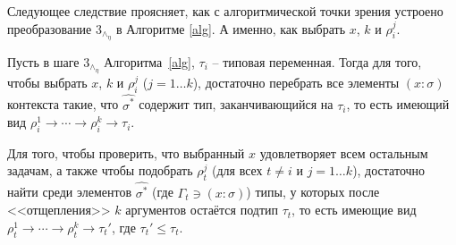 \documentclass{spbau-diploma}
\begin{document}
Следующее следствие проясняет, как с алгоритмической точки зрения устроено преобразование $3_\wedge_\eta$ в Алгоритме \ref{alg}. А именно, как выбрать $x$, $k$ и $\rho_i^j$.

\begin{corollary} \label{прояснение}
    Пусть в шаге $3_\wedge_\eta$ Алгоритма~\ref{alg}, $\tau_i$ -- типовая переменная. Тогда для того, чтобы выбрать $x$, $k$ и $\rho_i^j$ ($j = 1 \dots k$), достаточно перебрать все элементы $(x \colon \sigma)$ контекста такие, что $\hat{\sigma^*}$ содержит тип, заканчивающийся на $\tau_i$, то есть имеющий вид $\rho_i^1 \to \cdots \to \rho_i^k \to \tau_i$. 
    
    Для того, чтобы проверить, что выбранный $x$ удовлетворяет всем остальным задачам, а также чтобы подобрать $\rho_t^j$ (для всех $t \neq i$ и $j = 1 \dots k$), достаточно найти среди элементов $\hat{\sigma^*}$ (где $\Gamma_t \ni (x \colon \sigma)$) типы, у которых после <<отщепления>> $k$ аргументов остаётся подтип $\tau_t$, то есть имеющие вид $\rho_t^1 \to \cdots \to \rho_t^k \to \tau_t'$, где $\tau_t' \leqslant \tau_t$.
    
\end{corollary}
\end{document}
